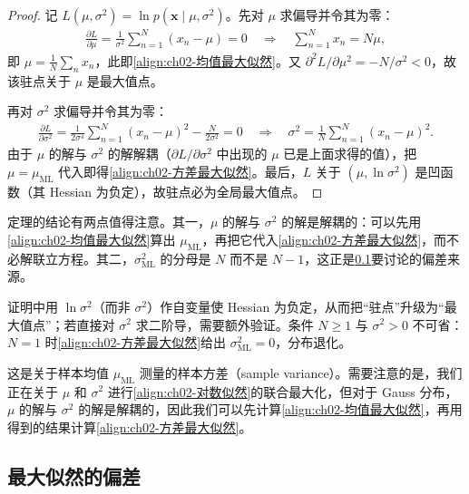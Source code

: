 \documentclass[../../main.tex]{subfiles}
\begin{document}
\begin{proof}
记 $L(\mu,\sigma^{2})=\ln p(\mathbf{x}\mid\mu,\sigma^{2})$。先对 $\mu$ 求偏导并令其为零：
\begin{align*}
 \frac{\partial L}{\partial\mu} = \frac{1}{\sigma^{2}}\sum_{n=1}^{N}(x_n-\mu) = 0
 \quad\Longrightarrow\quad
 \sum_{n=1}^{N}x_n = N\mu ,
\end{align*}
即 $\mu=\frac{1}{N}\sum_n x_n$，此即\eqref{align:ch02-均值最大似然}。又 $\partial^{2}L/\partial\mu^{2}=-N/\sigma^{2}<0$，故该驻点关于 $\mu$ 是最大值点。

再对 $\sigma^{2}$ 求偏导并令其为零：
\begin{align*}
 \frac{\partial L}{\partial\sigma^{2}} = \frac{1}{2\sigma^{4}}\sum_{n=1}^{N}(x_n-\mu)^{2} - \frac{N}{2\sigma^{2}} = 0
 \quad\Longrightarrow\quad
 \sigma^{2} = \frac{1}{N}\sum_{n=1}^{N}(x_n-\mu)^{2} .
\end{align*}
由于 $\mu$ 的解与 $\sigma^{2}$ 的解解耦（$\partial L/\partial\sigma^{2}$ 中出现的 $\mu$ 已是上面求得的值），把 $\mu=\mu_{\mathrm{ML}}$ 代入即得\eqref{align:ch02-方差最大似然}。最后，$L$ 关于 $(\mu,\ln\sigma^{2})$ 是凹函数（其 Hessian 为负定），故驻点必为全局最大值点。
\end{proof}

\begin{remark}
定理的结论有两点值得注意。其一，$\mu$ 的解与 $\sigma^{2}$ 的解是解耦的：可以先用\eqref{align:ch02-均值最大似然}算出 $\mu_{\mathrm{ML}}$，再把它代入\eqref{align:ch02-方差最大似然}，而不必解联立方程。其二，$\sigma_{\mathrm{ML}}^{2}$ 的分母是 $N$ 而不是 $N-1$，这正是\cref{subsection:ch02-最大似然的偏差}要讨论的偏差来源。

证明中用 $\ln\sigma^{2}$（而非 $\sigma^{2}$）作自变量使 Hessian 为负定，从而把“驻点”升级为“最大值点”；若直接对 $\sigma^{2}$ 求二阶导，需要额外验证。条件 $N\geqslant1$ 与 $\sigma^{2}>0$ 不可省：$N=1$ 时\eqref{align:ch02-方差最大似然}给出 $\sigma_{\mathrm{ML}}^{2}=0$，分布退化。
\end{remark}

这是关于样本均值 $\mu_{\mathrm{ML}}$ 测量的样本方差（sample variance）。需要注意的是，我们正在关于 $\mu$ 和 $\sigma^{2}$ 进行\eqref{align:ch02-对数似然}的联合最大化，但对于 Gauss 分布，$\mu$ 的解与 $\sigma^{2}$ 的解是解耦的，因此我们可以先计算\eqref{align:ch02-均值最大似然}，再用得到的结果计算\eqref{align:ch02-方差最大似然}。

\subsection{最大似然的偏差}\label{subsection:ch02-最大似然的偏差}
\end{document}
